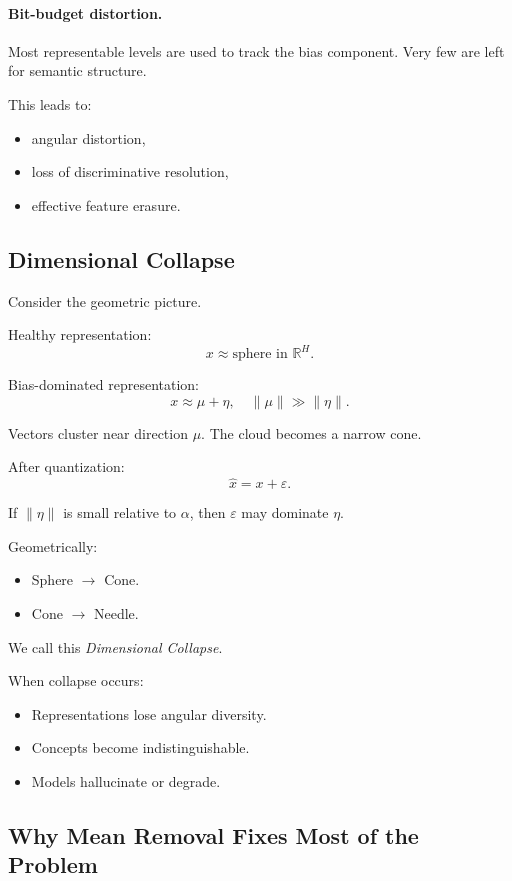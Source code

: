 \paragraph{Bit-budget distortion.}

Most representable levels are used to track the bias component.
Very few are left for semantic structure.

This leads to:
\begin{itemize}
\item angular distortion,
\item loss of discriminative resolution,
\item effective feature erasure.
\end{itemize}

\subsection{Dimensional Collapse}

Consider the geometric picture.

Healthy representation:
\[
x \approx \text{sphere in } \mathbb{R}^H.
\]

Bias-dominated representation:
\[
x \approx \mu + \eta,
\quad \|\mu\| \gg \|\eta\|.
\]

Vectors cluster near direction $\mu$.
The cloud becomes a narrow cone.

After quantization:
\[
\hat{x} = x + \varepsilon.
\]

If $\|\eta\|$ is small relative to $\alpha$,
then $\varepsilon$ may dominate $\eta$.

Geometrically:
\begin{itemize}
\item Sphere $\rightarrow$ Cone.
\item Cone $\rightarrow$ Needle.
\end{itemize}

We call this \emph{Dimensional Collapse}.

When collapse occurs:
\begin{itemize}
\item Representations lose angular diversity.
\item Concepts become indistinguishable.
\item Models hallucinate or degrade.
\end{itemize}

\subsection{Why Mean Removal Fixes Most of the Problem}

